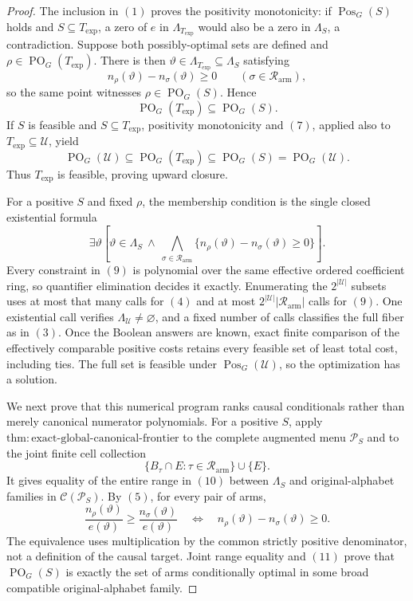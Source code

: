 \documentclass{article}
\begin{document}
\begin{proof}
The inclusion in \((1)\) proves the positivity monotonicity: if
\(\operatorname{Pos}_G(S)\) holds and \(S\subseteq T_{\mathrm{exp}}\), a zero of
\(e\) in \(\Lambda_{T_{\mathrm{exp}}}\) would also be a zero in \(\Lambda_S\), a
contradiction.  Suppose both possibly-optimal sets are defined and
\(\rho\in\operatorname{PO}_G(T_{\mathrm{exp}})\).  There is then
\(\vartheta\in\Lambda_{T_{\mathrm{exp}}}\subseteq\Lambda_S\) satisfying
\[
n_\rho(\vartheta)-n_\sigma(\vartheta)\geq0
\qquad(\sigma\in\mathcal R_{\mathrm{arm}}),
\tag{6}
\]
so the same point witnesses \(\rho\in\operatorname{PO}_G(S)\).  Hence
\[
\operatorname{PO}_G(T_{\mathrm{exp}})
\subseteq\operatorname{PO}_G(S).
\tag{7}
\]
If \(S\) is feasible and \(S\subseteq T_{\mathrm{exp}}\), positivity monotonicity
and \((7)\), applied also to \(T_{\mathrm{exp}}\subseteq\mathcal U\), yield
\[
\operatorname{PO}_G(\mathcal U)
\subseteq\operatorname{PO}_G(T_{\mathrm{exp}})
\subseteq\operatorname{PO}_G(S)
=\operatorname{PO}_G(\mathcal U).
\tag{8}
\]
Thus \(T_{\mathrm{exp}}\) is feasible, proving upward closure.

For a positive \(S\) and fixed \(\rho\), the membership condition is the single
closed existential formula
\[
\exists\vartheta\left[
\vartheta\in\Lambda_S\ \wedge\
\bigwedge_{\sigma\in\mathcal R_{\mathrm{arm}}}
\{n_\rho(\vartheta)-n_\sigma(\vartheta)\geq0\}
\right].
\tag{9}
\]
Every constraint in \((9)\) is polynomial over the same effective ordered
coefficient ring, so quantifier elimination decides it exactly.  Enumerating the
\(2^{|\mathcal U|}\) subsets uses at most that many calls for \((4)\) and at most
\(2^{|\mathcal U|}|\mathcal R_{\mathrm{arm}}|\) calls for \((9)\).  One existential
call verifies \(\Lambda_{\mathcal U}\ne\varnothing\), and a fixed number of calls
classifies the full fiber as in \((3)\).  Once the Boolean answers are known, exact
finite comparison of the effectively comparable positive costs retains every
feasible set of least total cost, including ties.  The full set is feasible under
\(\operatorname{Pos}_G(\mathcal U)\), so the optimization has a solution.

We next prove that this numerical program ranks causal conditionals rather than
merely canonical numerator polynomials.  For a positive \(S\), apply
\(\mathrm{thm:exact\text{-}global\text{-}canonical\text{-}frontier}\) to the complete
augmented menu \(\mathcal P_S\) and to the joint finite cell collection
\[
\{B_\tau\cap E:\tau\in\mathcal R_{\mathrm{arm}}\}\cup\{E\}.
\tag{10}
\]
It gives equality of the entire range in \((10)\) between \(\Lambda_S\) and
original-alphabet families in \(\mathcal C(\mathcal P_S)\).  By \((5)\), for every
pair of arms,
\[
\frac{n_\rho(\vartheta)}{e(\vartheta)}
\geq
\frac{n_\sigma(\vartheta)}{e(\vartheta)}
\quad\Longleftrightarrow\quad
n_\rho(\vartheta)-n_\sigma(\vartheta)\geq0.
\tag{11}
\]
The equivalence uses multiplication by the common strictly positive denominator,
not a definition of the causal target.  Joint range equality and \((11)\) prove that
\(\operatorname{PO}_G(S)\) is exactly the set of arms conditionally optimal in some
broad compatible original-alphabet family.


\end{proof}
\end{document}

